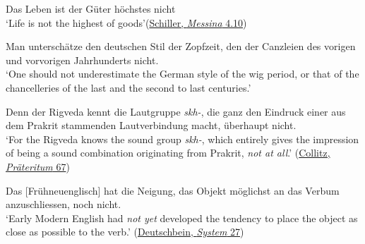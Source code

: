 \ea \label{ex:01-06}
Das Leben ist der Güter höchstes nicht\\
`Life is not the highest of goods'\hfill(\href{https://archive.org/details/bwb_W2-CNQ-459/page/146/mode/2up?q=%22Das+Leben+ijt+der+Gitter+Hichftes+nicht%22&view=theater}
{Schiller, \textit{Messina} 4.10})

\z

\ea \label{ex:01-07}
Man unterschätze den deutschen Stil der Zopfzeit, den der Canzleien des vorigen und vorvorigen Jahrhunderts nicht. \\ 
`One should not underestimate the German style of the wig period, or that of the chancelleries of the last and the second to last centuries.' 

\z

\ea \label{ex:01-08}
\ea
Denn der Rigveda kennt die Lautgruppe \emph{skh-}, die ganz den Eindruck einer aus dem Prakrit stammenden Lautverbindung macht, überhaupt nicht.\\
`For the Rigveda knows the sound group \textit{skh-}, which entirely gives the impression of being a sound combination originating from Prakrit, \emph{not at all}.'\hfill
(\href{https://archive.org/details/dasschwacheprt01colluoft/page/66/mode/2up?q=%22ber+Rigocba+fennt%22&view=theater}{Collitz, \textit{Präteritum} 67}) %

\ex
Das [Frühneuenglisch] hat die Neigung, das Objekt möglichst an das Verbum anzuschliessen, noch nicht.\\ %
`Early Modern English had \emph{not yet} developed the tendency to place the object as close as possible to the verb.'
\hfill (\href{https://archive.org/details/systemderneueng00deutgoog/page/n45/mode/2up?q=%22hat+die+neigung%22&view=theater}{Deutschbein, \textit{System} 27}) \\ %
\z
\z{}

